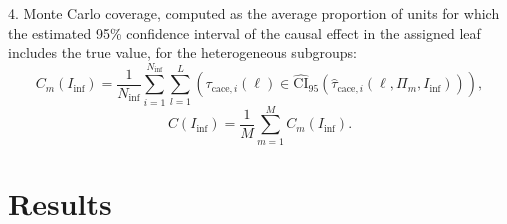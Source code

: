 4. Monte Carlo coverage, computed as the average proportion of units for which the estimated 95\% confidence interval of the causal effect in the assigned leaf includes the true value, for the heterogeneous subgroups:
\begin{equation}
C_m(I_\text{inf}) = \frac{1}{N_\text{inf}} \sum_{i=1}^{N_\text{inf}} \sum_{l=1}^{L} \left( \tau_{\text{cace},i}(\ell) \in \hat{\text{CI}}_{95} \left( \hat{\tau}_{\text{cace},i}(\ell, \Pi_m, I_\text{inf}) \right) \right),
\end{equation}
\begin{equation}
C(I_\text{inf}) = \frac{1}{M} \sum_{m=1}^{M} C_m(I_\text{inf}).
\end{equation}




\section{Results}
  
 


